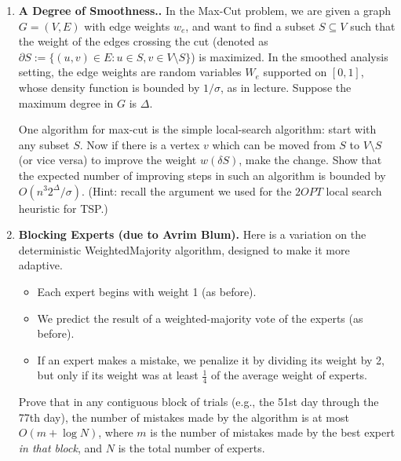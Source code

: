 \documentclass{article}
\theoremstyle{plain}
\newcommand\litem[1]{\item{\bfseries#1.\space}}
\begin{document}
\begin{enumerate}
\begin{enumerate}
If $T(n)$ is the time to find a negative-weight cycle in an $n$-node graph, and $W := max_{e\in E} |w_e|$,
a naive bound on the runtime of the above algorithm would be $O(nW) \cdot T(n)$, plus the time
to find the first perfect matching.
\item  For matching $M$, denote $w(M) := \sum_{e \in M}w_e$. Show that if $w(M) > w(M^∗)$ then there
exists a cycle in $H_M$ with weight-ratio1 at most $\frac{w(M^∗)-w(M)}{n}$, where $M^*$ is  a min-weight
perfect matching.
\item  Suppose we change the algorithm in (b) to use the minimum weight-ratio cycle $C$ at
each step. Bound the runtime of this algorithm by $O(n \log(nW)) \cdot T'(n)$, plus the time
to find the first perfect matching. Here $T'(n)$ is the time to find a minimum weight-ratio
cycle.
\end{enumerate}

\litem{A Degree of Smoothness.} In the Max-Cut problem, we are given a graph $G = (V, E)$
with edge weights $w_e$, and want to find a subset $S \subseteq V$ such that the weight of the edges
crossing the cut (denoted as $\partial S := \{(u, v) \in E : u \in S, v \in V \setminus S\}$) is maximized. In the
smoothed analysis setting, the edge weights are random variables $W_e$ supported on $[0, 1]$,
whose density function is bounded by $1/\sigma$, as in lecture. Suppose the maximum degree in $G$
is $\Delta$.

One algorithm for max-cut is the simple local-search algorithm: start with any subset $S$.
Now if there is a vertex $v$ which can be moved from $S$ to $V \setminus S$ (or vice versa) to improve the
weight $w(\delta S)$, make the change. Show that the expected number of improving steps in such
an algorithm is bounded by $O(n^{3}2^\Delta/\sigma)$. (Hint: recall the argument we used for the $2OPT$
local search heuristic for TSP.)

\litem{Blocking Experts (due to Avrim Blum)} Here is a variation on the deterministic WeightedMajority
algorithm, designed to make it more adaptive.
\begin{itemize}
\item Each expert begins with weight 1 (as before).
\item We predict the result of a weighted-majority vote of the experts (as before).
\item If an expert makes a mistake, we penalize it by dividing its weight by 2, but only if its
weight was at least $\frac{1}{4}$ of the average weight of experts.
  \end{itemize}
Prove that in any contiguous block of trials (e.g., the 51st day through the 77th day), the
number of mistakes made by the algorithm is at most $O(m + \log N)$, where $m$ is the number
of mistakes made by the best expert \emph{in that block}, and $N$ is the total number of experts.


\end{enumerate}
\end{document}
